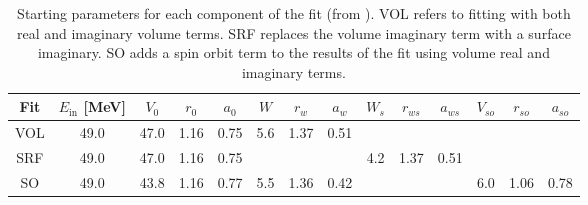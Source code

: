 \documentclass[]{scrartcl}
\begin{document}





\begin{table}
\centering
	\begin{tabular}{ c | c | c c c | c c c | c c c | c c c |  }
	Fit & $E _{\mathrm{in}}$ [MeV] & $ V _0$ & $ r _0$ & $ a _0$ & $W$ & $ r _{w} $ & $ a _{w} $ & $W_s$ &$ r _{ws}$ & $a_{ws}$ & $V_{so}$ & $r_{so}$ & $a_{so}$ \\
\hline
	VOL & 49.0 &  47.0 &  1.16 &  0.75  &  5.6 & 1.37 &  0.51 & & & & & & \\
	SRF & 49.0 &  47.0 &  1.16 &  0.75 & & &  &  4.2 & 1.37 &  0.51 & & & \\
\hline
	SO & 49.0 & 43.8 & 1.16 & 0.77 & 5.5 & 1.36 & 0.42 & & & & 6.0 & 1.06 & 0.78\\
\hline
	\end{tabular}
	\caption{Starting parameters for each component of the fit (from \citep{Menet1971}). VOL refers to fitting with both real and imaginary volume terms. SRF replaces the volume imaginary term with a surface imaginary. SO adds a spin orbit term to the results of the fit using volume real and imaginary terms.}
	\label{tab:init}
\end{table}


\end{document}
